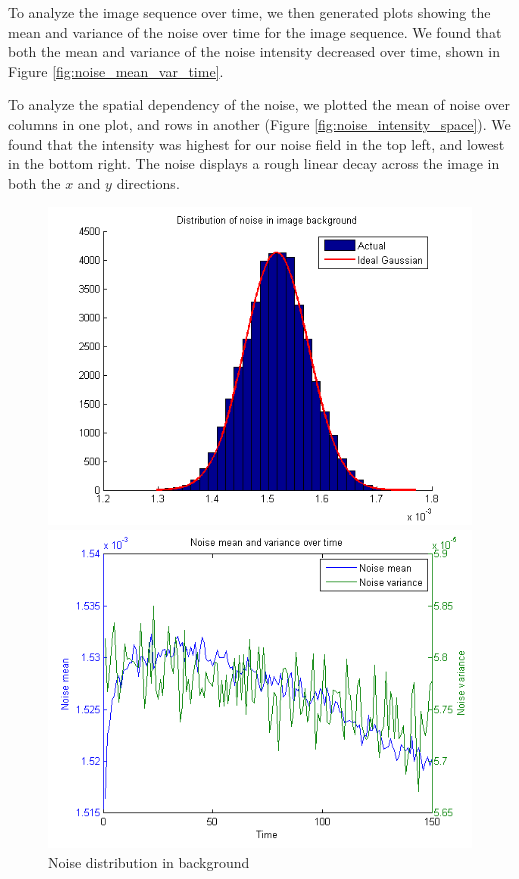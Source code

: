 \documentclass{article}
\begin{document}
To analyze the image sequence over time, we then generated plots showing the mean and variance of the noise over time for the image sequence. We found that both the mean and variance of the noise intensity decreased over time, shown in Figure \ref{fig:noise_mean_var_time}.

To analyze the spatial dependency of the noise, we plotted the mean of noise over columns in one plot, and rows in another (Figure \ref{fig:noise_intensity_space}). We found that the intensity was highest for our noise field in the top left, and lowest in the bottom right. The noise displays a rough linear decay across the image in both the $x$ and $y$ directions.


\begin{figure}[b]
\begin{minipage}[b]{0.45\linewidth}
\centering
\includegraphics[width=\textwidth]{figures/noise_distribution_background.png}
\caption{Noise distribution in background}
\label{fig:noise_dist_background}
\end{minipage}
\hspace{0.5cm}
\begin{minipage}[b]{0.45\linewidth}
\centering
\includegraphics[width=\textwidth]{figures/noise_mean_variance_over_time.png}

\end{minipage}
\end{figure}
\end{document}
